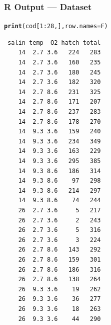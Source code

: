 \documentclass[oneside]{book}\usepackage[]{graphicx}\usepackage[svgnames]{xcolor}
\makeatletter
\newcommand{\hlnum}[1]{\textcolor[rgb]{0.686,0.059,0.569}{#1}}%
\newcommand{\hlopt}[1]{\textcolor[rgb]{0,0,0}{#1}}%
\newcommand{\hlstd}[1]{\textcolor[rgb]{0.345,0.345,0.345}{#1}}%
\newcommand{\hlkwc}[1]{\textcolor[rgb]{0.333,0.667,0.333}{#1}}%
\newcommand{\hlkwd}[1]{\textcolor[rgb]{0.737,0.353,0.396}{\textbf{#1}}}%
\newenvironment{kframe}{%
 \def\at@end@of@kframe{}%
 \ifinner\ifhmode%
  \def\at@end@of@kframe{\end{minipage}}%
  \begin{minipage}{\columnwidth}%
 \fi\fi%
 \def\FrameCommand##1{\hskip\@totalleftmargin \hskip-\fboxsep
 \colorbox{shadecolor}{##1}\hskip-\fboxsep
     \hskip-\linewidth \hskip-\@totalleftmargin \hskip\columnwidth}%
 \MakeFramed {\advance\hsize-\width
   \@totalleftmargin\z@ \linewidth\hsize
   \@setminipage}}%
 {\par\unskip\endMakeFramed%
 \at@end@of@kframe}
\newenvironment{knitrout}{}{} %
\makeatother
\begin{document}
\subsubsection*{R Output --- Dataset}
\begin{minipage}{0.4\textwidth}
\begin{knitrout}
\color{fgcolor}\begin{kframe}
\begin{alltt}
\hlkwd{print}\hlstd{(cod[}\hlnum{1}\hlopt{:}\hlnum{28}\hlstd{, ],} \hlkwc{row.names} \hlstd{= F)}
\end{alltt}
\begin{verbatim}
 salin temp  O2 hatch total
    14  2.7 3.6   224   283
    14  2.7 3.6   160   235
    14  2.7 3.6   180   245
    14  2.7 3.6   182   320
    14  2.7 8.6   231   325
    14  2.7 8.6   171   207
    14  2.7 8.6   237   283
    14  2.7 8.6   178   270
    14  9.3 3.6   159   240
    14  9.3 3.6   234   349
    14  9.3 3.6   163   229
    14  9.3 3.6   295   385
    14  9.3 8.6   186   314
    14  9.3 8.6    97   298
    14  9.3 8.6   214   297
    14  9.3 8.6    74   244
    26  2.7 3.6     5   217
    26  2.7 3.6     2   243
    26  2.7 3.6     5   316
    26  2.7 3.6     3   224
    26  2.7 8.6   143   292
    26  2.7 8.6   159   301
    26  2.7 8.6   186   316
    26  2.7 8.6   138   264
    26  9.3 3.6    19   262
    26  9.3 3.6    36   277
    26  9.3 3.6    18   263
    26  9.3 3.6    44   290
\end{verbatim}
\end{kframe}
\end{knitrout}
\end{minipage}
\end{document}
